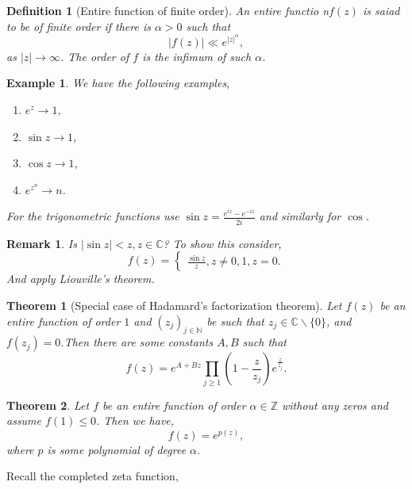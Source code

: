 \documentclass{article}
\newtheorem{theorem}{Theorem} [section]
\newtheorem{definition}{Definition}[section]
\newtheorem{remark}{Remark}[section]
\newtheorem{example}{Example}[section]
\newcommand{\N}[0]{\mathbb{N}}
\newcommand{\Z}[0]{\mathbb{Z}}
\newcommand{\C}[0]{\mathbb{C}}
\begin{document}
\begin{definition}[Entire function of finite order]
  An entire functio n$f(z)$ is saiad to be of finite order if there is $\alpha>0$ such that
  \begin{equation*}
    \vert f(z)\vert\ll e^{\vert z\vert^\alpha},
  \end{equation*}
  as $\vert z\vert\to\infty$. The order of $f$ is the infimum of such $\alpha$.
\end{definition}
\begin{example}We have the following examples,
  \begin{enumerate}
    \item $e^z\to1$,
    \item $\sin z\to1$,
    \item $\cos z\to 1$,
    \item $e^{z^n}\to n$.
  \end{enumerate}
  For the trigonometric functions use $\sin z = {\frac {e^{iz}-e^{-iz}} {2i}}$ and similarly for $\cos$.
\end{example}
\begin{remark}
  Is $\vert \sin z\vert<z,z\in\C$? To show this consider,
  \begin{equation*}
    f(z) =\begin{cases}
      {\frac {\sin z} z},z\not=0,
      1, z=0.
    \end{cases}
  \end{equation*}
  And apply Liouville's theorem.
\end{remark}
\begin{theorem}[Special case of Hadamard's factorization theorem]
  Let $f(z)$ be an entire function of order $1$ and $(z_j)_{j\in\N}$ be such that $z_j\in\C\backslash\{0\}$, and $f(z_j) = 0$.Then there are some constants $A,B$ such that 
  \begin{equation*}
    f(z) = e^{A+Bz}\prod_{j\geq1}\left(1-{\frac z {z_j}}\right)e^{{\frac z {z_j}}}.
  \end{equation*}
\end{theorem}
\begin{theorem}
  Let $f$ be an entire function of order $\alpha\in\Z$ without any zeros and assume $f(1)\leq0$. Then we have,
  \begin{equation*}
    f(z) = e^{p(z)},
  \end{equation*}
  where $p$ is some polynomial of degree $\alpha$.
\end{theorem}
Recall the completed zeta function,
\end{document}
